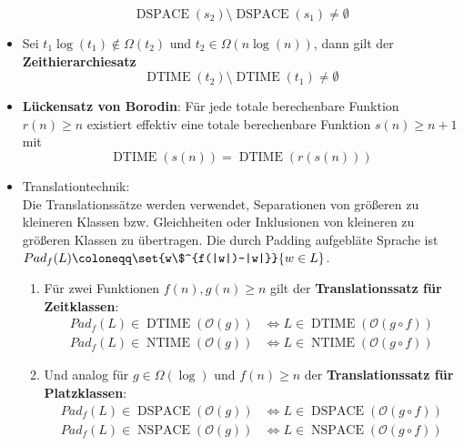 \begin{itemize}
	\begin{equation*}
		\operatorname{DSPACE}(s_2)\setminus\operatorname{DSPACE}(s_1)\not=\emptyset
	\end{equation*}
	\item Sei $t_1\log(t_1)\not\in\Omega(t_2)$ und $t_2\in\Omega(n\log(n))$, dann gilt der \textbf{Zeithierarchiesatz}
	\begin{equation*}
		\operatorname{DTIME}(t_2)\setminus\operatorname{DTIME}(t_1)\not=\emptyset
	\end{equation*}
	\item \textbf{Lückensatz von Borodin}: Für jede totale berechenbare Funktion $r(n)\geq n$ existiert effektiv eine totale berechenbare Funktion $s(n)\geq n+1$ mit
	\begin{equation*}
		\operatorname{DTIME}(s(n))=\operatorname{DTIME}(r(s(n)))
	\end{equation*}
	\item Translationtechnik:\\
	Die Translationssätze werden verwendet, Separationen von größeren zu kleineren Klassen bzw. Gleichheiten oder Inklusionen von kleineren zu größeren Klassen zu übertragen.
	Die durch Padding aufgebläte Sprache ist $Pad_f(L)\coloneqq \set{w\$^{f(|w|)-|w|}}{w\in L}$.
	\begin{enumerate}
		\item Für zwei Funktionen $f(n),g(n)\geq n$ gilt der \textbf{Translationssatz für Zeitklassen}:
		\begin{align*}
			Pad_f(L)\in \operatorname{DTIME}(\mathcal O(g))&\Leftrightarrow L\in \operatorname{DTIME}(\mathcal O(g\circ f))\\
			Pad_f(L)\in \operatorname{NTIME}(\mathcal O(g))&\Leftrightarrow L\in \operatorname{NTIME}(\mathcal O(g\circ f))
		\end{align*}
		\item Und analog für $g\in\Omega(\log)$ und $f(n)\geq n$ der \textbf{Translationssatz für Platzklassen}:
		\begin{align*}
			Pad_f(L)\in \operatorname{DSPACE}(\mathcal O(g))&\Leftrightarrow L\in \operatorname{DSPACE}(\mathcal O(g\circ f))\\
			Pad_f(L)\in \operatorname{NSPACE}(\mathcal O(g))&\Leftrightarrow L\in \operatorname{NSPACE}(\mathcal O(g\circ f))
		\end{align*}
	\end{enumerate}
\end{itemize}





